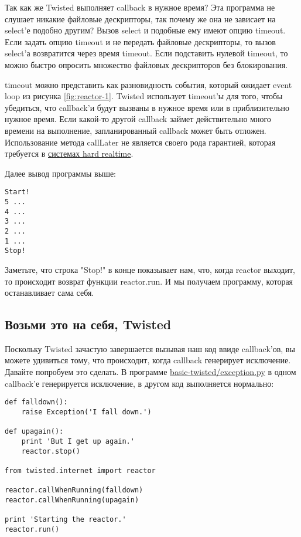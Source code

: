 Так как же Twisted выполняет callback в нужное время? 
Эта программа  не слушает никакие файловые 
дескрипторы, так почему же она не зависает на select'е 
подобно другим? Вызов select и подобные ему имеют  
опцию timeout. Если задать опцию timeout и не передать 
файловые дескрипторы, то вызов select'а возвратится через 
время timeout. Если подставить нулевой timeout, то можно 
быстро опросить множество файловых дескрипторов 
без блокирования.  


timeout можно представить как разновидность  
события, который ожидает event loop из рисунка \ref{fig:reactor-1}. 
Twisted использует timeout'ы для того, чтобы убедиться, что 
callback'и будут вызваны в нужное время или в приблизительно нужное время. 
Если какой-то другой callback займет действительно 
много времени на выполнение, запланированный callback 
может быть отложен. Использование метода callLater не 
является своего рода гарантией, которая требуется в 
\href{http://en.wikipedia.org/wiki/Real-time\_computing#Hard\_and\_soft\_real-time\_systems}{системах hard realtime}.


Далее вывод программы выше:

 \begin{verbatim}
Start!
5 ...
4 ...
3 ...
2 ...
1 ...
Stop!
\end{verbatim} 


Заметьте, что строка "Stop!" в конце показывает нам, что, 
когда reactor выходит, то происходит возврат функции reactor.run. 
И мы получаем программу, которая останавливает сама себя.


\subsection{Возьми это на себя, Twisted}

Поскольку Twisted зачастую завершается вызывая наш код ввиде 
callback'ов, вы можете удивиться тому, что происходит, когда 
callback генерирует исключение. Давайте попробуем это сделать. 
В программе 
\href{http://github.com/jdavisp3/twisted-intro/blob/master/basic-twisted/exception.py}{basic-twisted/exception.py} 
в одном callback'е генерируется исключение, в другом код выполняется нормально:

 \begin{verbatim}
def falldown():
    raise Exception('I fall down.')

def upagain():
    print 'But I get up again.'
    reactor.stop()

from twisted.internet import reactor

reactor.callWhenRunning(falldown)
reactor.callWhenRunning(upagain)

print 'Starting the reactor.'
reactor.run()
\end{verbatim} 


